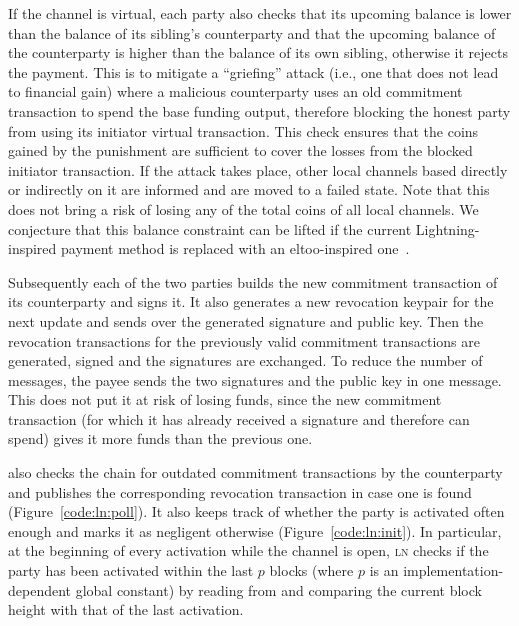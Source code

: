   If the channel is virtual, each party also checks that its upcoming balance is
  lower than the balance of its sibling's counterparty and that the upcoming
  balance of the counterparty is higher than the balance of its own sibling,
  otherwise it rejects the payment. This is to mitigate a ``griefing'' attack (i.e.,
  one that does not lead to financial gain) where a malicious counterparty
  uses an old commitment transaction to spend the base funding output, therefore
  blocking the honest party from using its initiator virtual transaction. This
  check ensures that the coins gained by the punishment are sufficient to cover
  the losses from the blocked initiator transaction. If the attack takes place,
  other local channels based directly or indirectly on it are informed and are
  moved to a failed state. Note that this does not bring a risk of losing any of
  the total coins of all local channels. We conjecture that this balance
  constraint can be lifted if the current Lightning-inspired payment method is
  replaced with an eltoo-inspired one~\cite{eltoo}.

  Subsequently each of the two parties builds the new commitment transaction of
  its counterparty and signs it. It also generates a new revocation keypair for
  the next update and sends over the generated signature and public key. Then
  the revocation transactions for the previously valid commitment transactions
  are generated, signed and the signatures are exchanged. To reduce the number
  of messages, the payee sends the two signatures and the public key in one
  message. This does not put it at risk of losing funds, since the new
  commitment transaction (for which it has already received a signature and
  therefore can spend) gives it more funds than the previous one.

  \pchan also checks the chain for outdated commitment transactions by the
  counterparty and publishes the corresponding revocation transaction in case
  one is found (Figure~\ref{code:ln:poll}). It also keeps track of whether the
  party is activated often enough and marks it as negligent otherwise
  (Figure~\ref{code:ln:init}). In particular, at the beginning of every activation
  while the channel is open, \textsc{ln} checks if the party has been activated
  within the last $p$ blocks (where $p$ is an implementation-dependent global
  constant) by reading from \ledger and comparing the current block height with
  that of the last activation.

